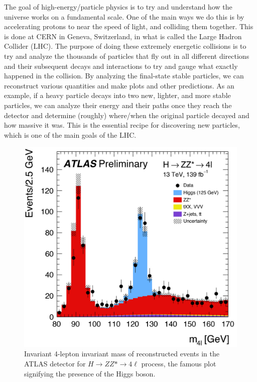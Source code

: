 The goal of high-energy/particle physics is to try and understand how the universe works on a fundamental scale. One of the main ways we do this is by accelerating protons to near the speed of light, and colliding them together. This is done at CERN in Geneva, Switzerland, in what is called the Large Hadron Collider (LHC). The purpose of doing these extremely energetic collisions is to try and analyze the thousands of particles that fly out in all different directions and their subsequent decays and interactions to try and gauge what exactly happened in the collision. By analyzing the final-state stable particles, we can reconstruct various quantities and make plots and other predictions. As an example, if a heavy particle decays into two new, lighter, and more stable particles, we can analyze their energy and their paths once they reach the detector and determine (roughly) where/when the original particle decayed and how massive it was. This is the essential recipe for discovering new particles, which is one of the main goals of the LHC.

\begin{figure}[ht]
  \centering
  \includegraphics[width=0.6\linewidth]{./res/gfx/higgs.jpg}
  \caption{Invariant 4-lepton invariant mass of reconstructed events in the ATLAS detector for $H \rightarrow ZZ* \rightarrow 4\ell$ process, the famous plot signifying the presence of the Higgs boson.}
  \label{fig:higgs}
\end{figure}

